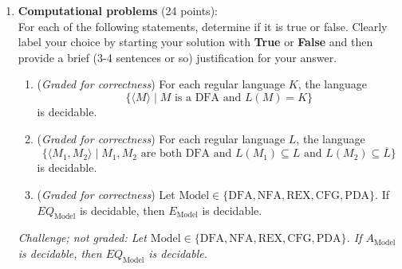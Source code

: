 \documentclass[12pt, oneside]{article}
\newcommand{\gradeCorrect}{({\it Graded for correctness}) }
\newcommand{\gradeComplete}{({\it Graded for completeness}) }
\newcommand{\SUBSTRING}{\textsc{Substring}}
\begin{document}
\begin{enumerate}
\begin{enumerate}
    \item\gradeComplete Give a different proof that the class of Turing-recognizable 
    languages over $\Gamma$ is closed 
    under the $\SUBSTRING$ operation, this time using only deterministic Turing machines.  A complete answer will 
    include both a precise construction of the machine and a 
    (brief) justification of why this machine works as required.

\end{enumerate}


\item \textbf{Computational problems} (24 points): \\
For each of the following statements, determine if it is true or false. 
Clearly label your choice 
by starting your solution with {\bf True} or {\bf False} and then
provide a brief (3-4 sentences or so) justification for your answer.

\begin{enumerate}
\item\gradeCorrect For each regular language $K$, the language 
\[
\{ \langle M \rangle \mid M \text{ is a DFA and } L(M) = K\} 
\]
is decidable.

\item\gradeCorrect For each regular language $L$, the language
\[
\{ \langle M_1, M_2 \rangle \mid M_1, M_2\text{ are both DFA and } 
L(M_1) \subseteq L \text{ and } L(M_2) \subseteq \overline{L}\}
\]
is decidable.


\item\gradeCorrect Let $\mathrm{Model} \in \{\mathrm{DFA}, \mathrm{NFA}, 
\mathrm{REX}, \mathrm{CFG}, \mathrm{PDA} \}$. If $EQ_{\mathrm{Model}}$ is decidable, 
then $E_{\mathrm{Model}}$ is decidable.

\end{enumerate}

{\it Challenge; not graded: Let $\mathrm{Model} \in \{\mathrm{DFA}, \mathrm{NFA}, 
\mathrm{REX}, \mathrm{CFG}, \mathrm{PDA} \}$. If $A_{\mathrm{Model}}$ is decidable, 
then $EQ_{\mathrm{Model}}$ is decidable.}

\end{enumerate}
\end{document}
